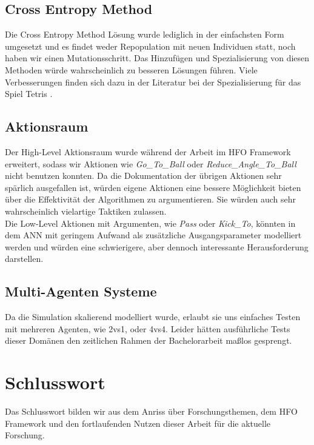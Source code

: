 
        \subsection*{Cross Entropy Method}
            Die Cross Entropy Method Lösung wurde lediglich in der einfachsten Form umgesetzt und es findet weder Repopulation mit neuen Individuen statt, noch haben wir einen Mutationsschritt. Das Hinzufügen und Spezialisierung von diesen Methoden würde wahrscheinlich zu besseren Lösungen führen. Viele Verbesserungen finden sich dazu in der Literatur bei der Spezialisierung für das Spiel Tetris \cite{cem}.

        \subsection*{Aktionsraum}
            Der High-Level Aktionsraum wurde während der Arbeit im HFO Framework erweitert, sodass wir Aktionen wie \textit{Go\_To\_Ball} oder \textit{Reduce\_Angle\_To\_Ball} nicht benutzen konnten. Da die Dokumentation der übrigen Aktionen sehr spärlich ausgefallen ist, würden eigene Aktionen eine bessere Möglichkeit bieten über die Effektivität der Algorithmen zu argumentieren. Sie würden auch sehr wahrscheinlich vielartige Taktiken zulassen. \\

            \noindent
            Die Low-Level Aktionen mit Argumenten, wie \textit{Pass} oder \textit{Kick\_To}, könnten in dem ANN mit geringem Aufwand als zusätzliche Ausgangsparameter modelliert werden und würden eine schwierigere, aber dennoch interessante Herausforderung darstellen.


        \subsection*{Multi-Agenten Systeme}
            Da die Simulation skalierend modelliert wurde, erlaubt sie uns einfaches Testen mit mehreren Agenten, wie 2vs1, oder 4vs4. Leider hätten ausführliche Tests dieser Domänen den zeitlichen Rahmen der Bachelorarbeit maßlos gesprengt. 

\newpage

    \section{Schlusswort}
        Das Schlusswort bilden wir aus dem Anriss über Forschungsthemen, dem HFO Framework und den fortlaufenden Nutzen dieser Arbeit für die aktuelle Forschung.


